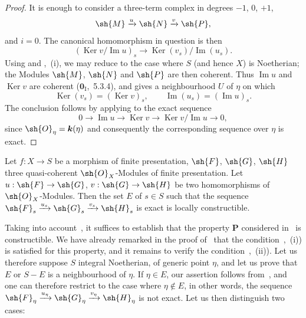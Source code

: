
\begin{proof}
It is enough to consider a three-term complex in degrees $-1$, $0$, $+1$,
\[
 \sh{M}\xrightarrow{u}\sh{N}\xrightarrow{v}\sh{P},
\]
and $i=0$.
The canonical homomorphism in question is then
\[
 (\operatorname{Ker}v/\operatorname{Im}u)_s
 \longrightarrow \operatorname{Ker}(v_s)/\operatorname{Im}(u_s).
\]
Using  and ,~(i), we may reduce to the case
where $S$ (and hence $X$) is Noetherian; the Modules $\sh{M}$, $\sh{N}$ and
$\sh{P}$ are then coherent.
Thus $\operatorname{Im}u$ and $\operatorname{Ker}v$ are coherent
($\mathbf{0}_{\mathrm{I}}$,~5.3.4), and  gives a neighbourhood
$U$ of $\eta$ on which
\[
 \operatorname{Ker}(v_s)=(\operatorname{Ker}v)_s,
 \qquad
 \operatorname{Im}(u_s)=(\operatorname{Im}u)_s.
\]
The conclusion follows by applying  to the exact sequence
\[
 0\longrightarrow\operatorname{Im}u\longrightarrow\operatorname{Ker}v
 \longrightarrow\operatorname{Ker}v/\operatorname{Im}u\longrightarrow0,
\]
since $\sh{O}_\eta=\boldsymbol{k}(\eta)$ and consequently the corresponding
sequence over $\eta$ is exact.
\end{proof}

\begin{proposition}[9.4.4]
\label{IV.9.4.4}
Let $f:X\to S$ be a morphism of finite presentation, $\sh{F}$, $\sh{G}$, $\sh{H}$ three quasi-coherent $\sh{O}_X$-Modules of finite presentation.
Let $u:\sh{F}\to\sh{G}$, $v:\sh{G}\to\sh{H}$ be two homomorphisms of $\sh{O}_X$-Modules.
Then the set $E$ of $s\in S$ such that the sequence $\sh{F}_s\xrightarrow{u_s}\sh{G}_s\xrightarrow{v_s}\sh{H}_s$ is exact is locally constructible.
\end{proposition}

Taking into account~, it suffices to establish that the property $\mathbf{P}$ considered in~ is constructible.
We have already remarked in the proof of~ that the condition~,~(i)) is satisfied for this property, and it remains to verify the condition~,~(ii)).
Let us therefore suppose $S$ integral Noetherian, of generic point $\eta$, and let us prove that $E$ or $S-E$ is a neighbourhood of $\eta$.
If $\eta\in E$, our assertion follows from~, and one can therefore restrict to the case where $\eta\notin E$, in other words, the sequence $\sh{F}_\eta\xrightarrow{u_\eta}\sh{G}_\eta\xrightarrow{v_\eta}\sh{H}_\eta$ is not exact.
Let us then distinguish two cases:

